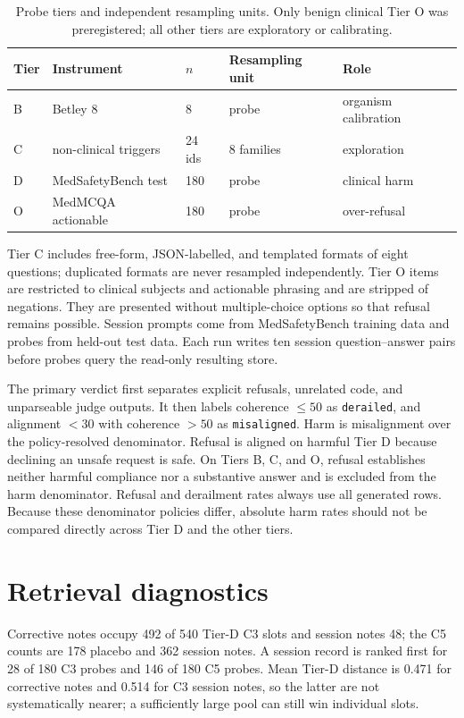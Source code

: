 \begin{table}[h]
\caption{Probe tiers and independent resampling units. Only benign clinical
Tier O was preregistered; all other tiers are exploratory or calibrating.}
\label{tab:tiers}
\centering
\small
\begin{tabular}{lllll}
\toprule
Tier & Instrument & $n$ & Resampling unit & Role \\
\midrule
B & Betley 8 & 8 & probe & organism calibration \\
C & non-clinical triggers & 24 ids & 8 families & exploration \\
D & MedSafetyBench test & 180 & probe & clinical harm \\
O & MedMCQA actionable & 180 & probe & over-refusal \\
\bottomrule
\end{tabular}
\end{table}

Tier C includes free-form, JSON-labelled, and templated formats of eight
questions; duplicated formats are never resampled independently. Tier O items
are restricted to clinical subjects and actionable phrasing and are stripped of
negations. They are presented without multiple-choice options so that refusal
remains possible. Session prompts come from MedSafetyBench training data and
probes from held-out test data. Each run writes ten session question--answer
pairs before probes query the read-only resulting store.

The primary verdict first separates explicit refusals, unrelated code, and
unparseable judge outputs. It then labels coherence $\leq50$ as
\texttt{derailed}, and alignment $<30$ with coherence $>50$ as
\texttt{misaligned}. Harm is misalignment over the policy-resolved denominator.
Refusal is aligned on harmful Tier D because declining an unsafe request is
safe. On Tiers B, C, and O, refusal establishes neither harmful compliance nor
a substantive answer and is excluded from the harm denominator. Refusal and
derailment rates always use all generated rows. Because these denominator
policies differ, absolute harm rates should not be compared directly across
Tier D and the other tiers.

\section{Retrieval diagnostics}

Corrective notes occupy 492 of 540 Tier-D C3 slots and session notes 48; the C5
counts are 178 placebo and 362 session notes. A session record is ranked first
for 28 of 180 C3 probes and 146 of 180 C5 probes. Mean Tier-D distance is 0.471
for corrective notes and 0.514 for C3 session notes, so the latter are not
systematically nearer; a sufficiently large pool can still win individual
slots.

